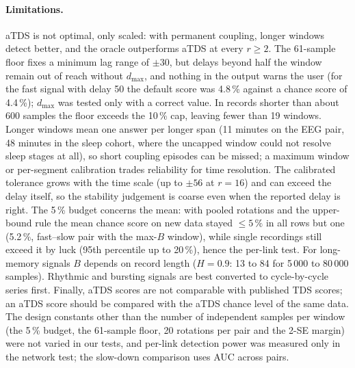 \documentclass[11pt,a4paper]{article}
\begin{document}
\paragraph{Limitations.} aTDS is not optimal, only scaled: with permanent coupling, longer windows detect better, and the oracle outperforms aTDS at every $r \ge 2$. The 61-sample floor fixes a minimum lag range of $\pm30$, but delays beyond half the window remain out of reach without $d_{\max}$, and nothing in the output warns the user (for the fast signal with delay 50 the default score was 4.8\,\% against a chance score of 4.4\,\%); $d_{\max}$ was tested only with a correct value. In records shorter than about 600 samples the floor exceeds the 10\,\% cap, leaving fewer than 19 windows. Longer windows mean one answer per longer span (11 minutes on the EEG pair, 48 minutes in the sleep cohort, where the uncapped window could not resolve sleep stages at all), so short coupling episodes can be missed; a maximum window or per-segment calibration trades reliability for time resolution. The calibrated tolerance grows with the time scale (up to $\pm56$ at $r = 16$) and can exceed the delay itself, so the stability judgement is coarse even when the reported delay is right. The 5\,\% budget concerns the mean: with pooled rotations and the upper-bound rule the mean chance score on new data stayed $\le 5\,\%$ in all rows but one (5.2\,\%, fast--slow pair with the max-$B$ window), while single recordings still exceed it by luck (95th percentile up to 20\,\%), hence the per-link test. For long-memory signals $B$ depends on record length ($H = 0.9$: 13 to 84 for 5\,000 to 80\,000 samples). Rhythmic and bursting signals are best converted to cycle-by-cycle series first. Finally, aTDS scores are not comparable with published TDS scores; an aTDS score should be compared with the aTDS chance level of the same data. The design constants other than the number of independent samples per window (the 5\,\% budget, the 61-sample floor, 20 rotations per pair and the 2-SE margin) were not varied in our tests, and per-link detection power was measured only in the network test; the slow-down comparison uses AUC across pairs.
\end{document}
